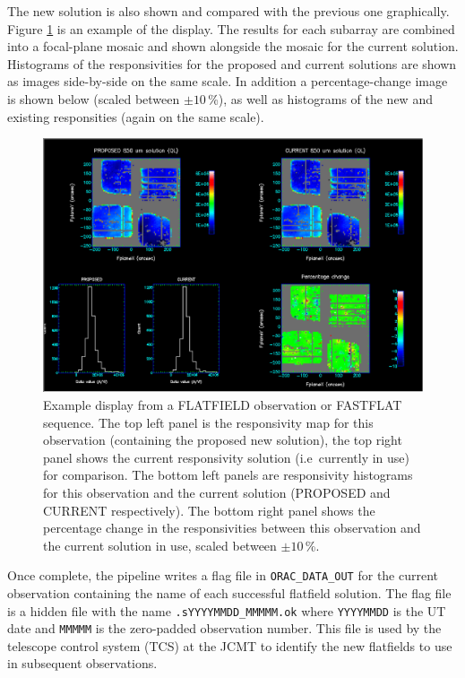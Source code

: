 \documentclass[twoside,11pt]{article}
\renewcommand{\_}{\texttt{\symbol{95}}}
\begin{document}
The new solution is also shown and compared with the previous one
graphically. Figure \ref{fig:flatfield} is an example of the
display. The results for each subarray are combined into a focal-plane
mosaic and shown alongside the mosaic for the current
solution. Histograms of the responsivities for the proposed and
current solutions are shown as images side-by-side on the same
scale. In addition a percentage-change image is shown below (scaled
between $\pm10$\,\%), as well as histograms of the new and existing
responsities (again on the same scale).

\begin{figure}[t]
\centering
\includegraphics[width=\textwidth]{sun264_flatfield.eps}
\caption{Example display from a FLATFIELD observation or FASTFLAT
  sequence. The top left panel is the responsivity map for this
  observation (containing the proposed new solution), the top right
  panel shows the current responsivity solution (i.e\ currently in
  use) for comparison. The bottom left panels are responsivity
  histograms for this observation and the current solution (PROPOSED
  and CURRENT respectively). The bottom right panel shows the
  percentage change in the responsivities between this observation and
  the current solution in use, scaled between
  $\pm10$\,\%.\label{fig:flatfield}}
\end{figure}

Once complete, the pipeline writes a flag file in
\verb+ORAC_DATA_OUT+ for the current observation containing the name
of each successful flatfield solution. The flag file is a hidden file
with the name \verb+.sYYYYMMDD_MMMMM.ok+ where \verb+YYYYMMDD+ is the
UT date and \verb+MMMMM+ is the zero-padded observation number. This
file is used by the telescope control system (TCS) at the JCMT to
identify the new flatfields to use in subsequent observations.
\end{document}
